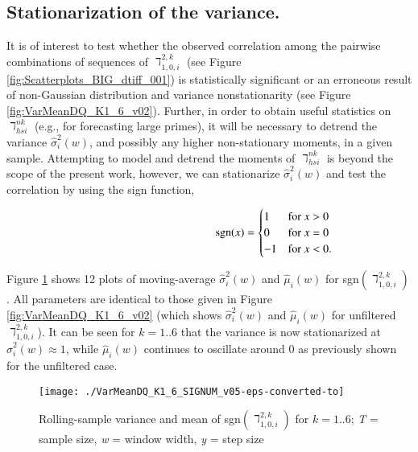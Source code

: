 \documentclass[12pt,longtitle,times]{amsart}
\begin{document}
\subsection[short]{Stationarization of the variance.} It is of interest to test whether the observed correlation among the pairwise combinations of sequences of $\daleth_{1,0,i}^{2,k}$ (see Figure \ref{fig:Scatterplots_BIG_dtiff_001}) is statistically significant or an erroneous result of non-Gaussian distribution and variance nonstationarity (see Figure \ref{fig:VarMeanDQ_K1_6_v02}). Further, in order to obtain useful statistics on $\daleth_{hsi}^{nk}$ (e.g., for forecasting large primes), it will be necessary to detrend the variance $\hat{\sigma}_i^2(w)$, and possibly any higher non-stationary moments, in a given sample. Attempting to model and detrend the moments of $\daleth_{hsi}^{nk}$ is beyond the scope of the present work, however, we can stationarize $\hat{\sigma}_i^2(w)$ and test the correlation by using the sign function,

\[
\hphantom{--------------}\text{sgn}(x)= 
\begin{cases}
    1        & \text{for } x > 0\\
    0        & \text{for } x = 0\\
    -1       & \text{for } x < 0.\\
\end{cases} 
\]

Figure \ref{fig:VarMeanDQ_K1_6_SIGNUM_v01} shows 12 plots of moving-average $\hat{\sigma}_i^2(w)$ and $\hat{\mu}_i(w)$ for sgn$(\daleth_{1,0,i}^{2,k})$. All parameters are identical to those given in Figure \ref{fig:VarMeanDQ_K1_6_v02} (which shows $\hat{\sigma}_i^2(w)$ and $\hat{\mu}_i(w)$ for unfiltered $\daleth_{1,0,i}^{2,k}$). It can be seen for $k=1..6$ that the variance is now stationarized at $\hat{\sigma}_i^2(w) \approx{} 1$, while $\hat{\mu}_i(w)$ continues to oscillate around $0$ as previously shown for the unfiltered case.

\begin{figure}[hp]
\centering
\texttt{[image: ./VarMeanDQ\_K1\_6\_SIGNUM\_v05-eps-converted-to]}
\caption{Rolling-sample variance and mean of sgn$(\daleth_{1,0,i}^{2,k})$ for $k=1..6$; \textit{T} = sample size, \textit{w} = window width, \textit{y} = step size}
\label{fig:VarMeanDQ_K1_6_SIGNUM_v01}
\end{figure}
\end{document}
